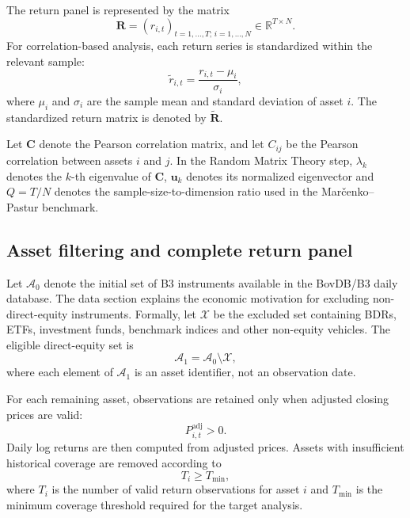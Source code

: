 The return panel is represented by the matrix
\begin{equation}
\mathbf{R}
=
\left(r_{i,t}\right)_{t=1,\ldots,T;\,i=1,\ldots,N}
\in
\mathbb{R}^{T \times N}.
\end{equation}
For correlation-based analysis, each return series is standardized within the relevant sample:
\begin{equation}
\tilde{r}_{i,t}
=
\frac{r_{i,t}-\mu_i}{\sigma_i},
\end{equation}
where $\mu_i$ and $\sigma_i$ are the sample mean and standard deviation of asset $i$. The standardized return matrix is denoted by $\widetilde{\mathbf{R}}$.

Let $\mathbf{C}$ denote the Pearson correlation matrix, and let $C_{ij}$ be the Pearson correlation between assets $i$ and $j$. In the Random Matrix Theory step, $\lambda_k$ denotes the $k$-th eigenvalue of $\mathbf{C}$, $\mathbf{u}_k$ denotes its normalized eigenvector and $Q=T/N$ denotes the sample-size-to-dimension ratio used in the Mar\v{c}enko--Pastur benchmark.

\subsection{Asset filtering and complete return panel}
\label{subsec:asset_filtering}

Let $\mathcal{A}_0$ denote the initial set of B3 instruments available in the BovDB/B3 daily database. The data section explains the economic motivation for excluding non-direct-equity instruments. Formally, let $\mathcal{X}$ be the excluded set containing BDRs, ETFs, investment funds, benchmark indices and other non-equity vehicles. The eligible direct-equity set is
\begin{equation}
\mathcal{A}_1
=
\mathcal{A}_0
\setminus
\mathcal{X},
\end{equation}
where each element of $\mathcal{A}_1$ is an asset identifier, not an observation date.

For each remaining asset, observations are retained only when adjusted closing prices are valid:
\begin{equation}
P^{\mathrm{adj}}_{i,t} > 0.
\end{equation}
Daily log returns are then computed from adjusted prices. Assets with insufficient historical coverage are removed according to
\begin{equation}
T_i \geq T_{\min},
\end{equation}
where $T_i$ is the number of valid return observations for asset $i$ and $T_{\min}$ is the minimum coverage threshold required for the target analysis.

